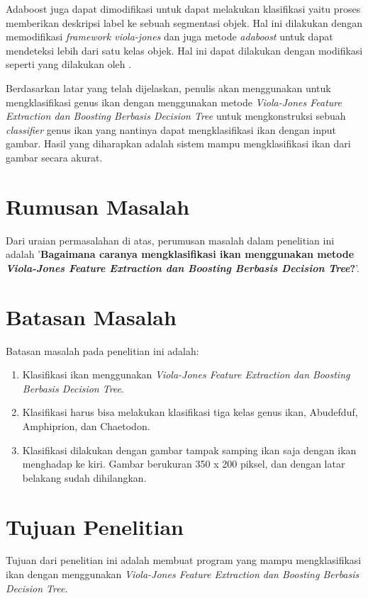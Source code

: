 Adaboost juga dapat dimodifikasi untuk dapat melakukan klasifikasi yaitu proses 
memberikan deskripsi label ke sebuah segmentasi objek. Hal ini dilakukan dengan 
memodifikasi \textit{framework viola-jones} dan juga metode \textit{adaboost} untuk 
dapat mendeteksi lebih dari satu kelas objek. Hal ini dapat dilakukan dengan modifikasi 
seperti yang dilakukan oleh \cite{samme}.

Berdasarkan latar yang telah dijelaskan, penulis akan menggunakan untuk mengklasifikasi
genus ikan dengan menggunakan metode \emph{Viola-Jones Feature Extraction dan Boosting Berbasis 
	Decision Tree} untuk 
mengkonstruksi sebuah \emph{classifier} genus ikan yang nantinya dapat mengklasifikasi 
ikan dengan input gambar. Hasil yang diharapkan adalah sistem 
mampu mengklasifikasi ikan dari gambar secara akurat.

\section{Rumusan Masalah}
Dari uraian permasalahan di atas, perumusan masalah dalam penelitian ini adalah 
'\textbf{Bagaimana caranya mengklasifikasi ikan menggunakan metode 
\textit{Viola-Jones Feature Extraction dan Boosting Berbasis 
	Decision Tree}?}'.

\section{Batasan Masalah}
Batasan masalah pada penelitian ini adalah:
\begin{enumerate}
	\item Klasifikasi ikan menggunakan \textit{Viola-Jones Feature Extraction dan Boosting Berbasis 
	Decision Tree}.
	\item Klasifikasi harus bisa melakukan klasifikasi tiga kelas genus ikan, Abudefduf, Amphiprion, dan Chaetodon.
	\item Klasifikasi dilakukan dengan gambar tampak samping ikan saja dengan ikan menghadap ke kiri. Gambar 
	berukuran 350 x 200 piksel, dan dengan latar belakang sudah dihilangkan.
\end{enumerate}

\section{Tujuan Penelitian}
	Tujuan dari penelitian ini adalah membuat program yang mampu
	mengklasifikasi ikan dengan menggunakan \textit{Viola-Jones Feature Extraction dan Boosting Berbasis 
	Decision Tree}. 


